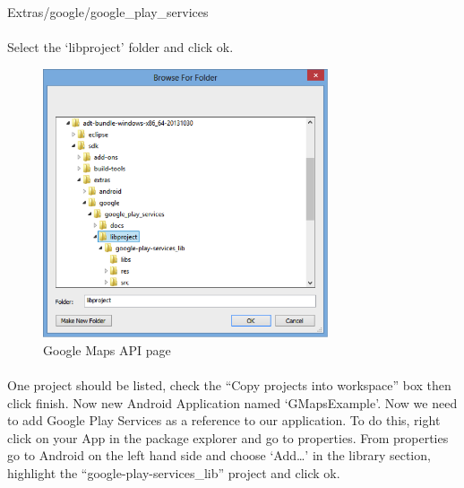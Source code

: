 \begin{framed}
Extras/google/google\_play\_services
\end{framed}
\paragraph{} Select the ‘libproject’ folder and click ok.

\begin{figure}[H]%
\centering
\includegraphics[width=0.75\textwidth]{images/libproject}
\caption{Google Maps API page}
\label{fig:libproject}
\end{figure}

\paragraph{} One project should be listed, check the “Copy projects into workspace” box then click finish. Now new Android Application named ‘GMapsExample’.  Now we need to add Google Play Services as a reference to our application. To do this, right click on your App in the package explorer and go to properties.  From properties go to Android on the left hand side and choose ‘Add…’ in the library section, highlight the “google-play-services\_lib” project and click ok.

